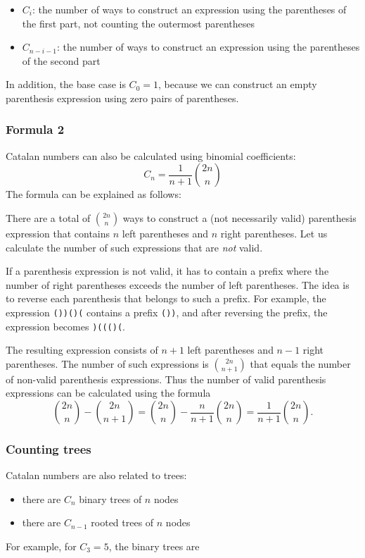 \begin{itemize}
\item $C_{i}$: the number of ways to construct an expression
using the parentheses of the first part,
not counting the outermost parentheses
\item $C_{n-i-1}$: the number of ways to construct an
expression using the parentheses of the second part
\end{itemize}
In addition, the base case is $C_0=1$,
because we can construct an empty parenthesis
expression using zero pairs of parentheses.

\subsubsection{Formula 2}

Catalan numbers can also be calculated
using binomial coefficients:
\[ C_n = \frac{1}{n+1} {2n \choose n}\]
The formula can be explained as follows:

There are a total of ${2n \choose n}$ ways
to construct a (not necessarily valid)
parenthesis expression that contains $n$ left
parentheses and $n$ right parentheses.
Let us calculate the number of such
expressions that are \emph{not} valid.

If a parenthesis expression is not valid,
it has to contain a prefix where the
number of right parentheses exceeds the
number of left parentheses.
The idea is to reverse each parenthesis
that belongs to such a prefix.
For example, the expression
\texttt{())()(} contains a prefix \texttt{())},
and after reversing the prefix,
the expression becomes \texttt{)((()(}.

The resulting expression consists of $n+1$
left parentheses and $n-1$ right parentheses.
The number of such expressions is ${2n \choose n+1}$
that equals the number of non-valid
parenthesis expressions.
Thus the number of valid parenthesis
expressions can be calculated using the formula
\[{2n \choose n}-{2n \choose n+1} = {2n \choose n} - \frac{n}{n+1} {2n \choose n} = \frac{1}{n+1} {2n \choose n}.\]

\subsubsection{Counting trees}

Catalan numbers are also related to trees:

\begin{itemize}
\item there are $C_n$ binary trees of $n$ nodes
\item there are $C_{n-1}$ rooted trees of $n$ nodes
\end{itemize}
\noindent
For example, for $C_3=5$, the binary trees are


